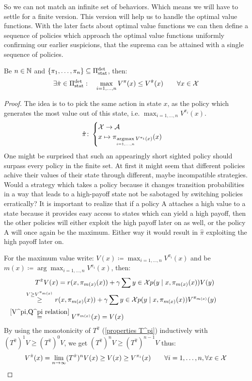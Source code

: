 So we can not match an infinite set of behaviors. Which means we will have to settle for a finite version. This version will help us to handle the optimal value functions. With the later facts about optimal value functions we can then define a sequence of policies which approach the optimal value functions uniformly confirming our earlier suspicions, that the suprema can be attained with a single sequence of policies. 

\begin{prop}\label{finite outmatching}
	Be \(n\in\mathbb{N}\) and \(\{\pi_1,\dots,\pi_n\}\subseteq \Pi_{\textnormal{stat}}^{\textnormal{det}} \), then:
	\[\exists \hat{\pi}\in\Pi_{\textnormal{stat}}^{\textnormal{det}}: \quad \max_{i=1,\dots,n} V^\pi(x)\le V^{\hat{\pi}}(x) \qquad \forall x\in\mathcal{X} \]
\end{prop}
\begin{proof}
	The idea is to to pick the same action in state \(x\), as the policy which generates the most value out of this state, i.e. \(\max_{i=1,\dots,n}V^{\pi_i}(x)\). 
	\[
		\hat{\pi}\colon
	\begin{cases} 
		\mathcal{X}\to\mathcal{A}\\
		x\mapsto \pi_{\mathop{\text{argmax}}\limits_{i=1,\dots,n}V^{\pi_i}(x)}(x)
	\end{cases}
	\]
	One might be surprised that such an appearingly short sighted policy should surpass every policy in the finite set. At first it might seem that different policies achive their values of their state through different, maybe incompatible strategies. Would a strategy which takes a policy because it changes transition probabilities in a way that leads to a high-payoff state not be sabotaged by switching policies erratically?
	It is important to realize that if a policy A attaches a high value to a state because it provides easy access to states which can yield a high payoff, then the other policies will either exploit the high payoff later on as well, or the policy A will once again be the maximum. Either way it would result in \(\hat{\pi}\) exploiting the high payoff later on. 

	For the maximum value write: \(V(x)\coloneqq \max_{i=1,\dots, n}V^{\pi_i}(x)\) and be \(m(x) \coloneqq \arg\max_{i=1,\dots,n}V^{\pi_i}(x)\), then:
	\begin{align*}
		&T^{\hat{\pi}}V(x)=r(x,\pi_{m(x)}(x))
		+\gamma \sum{y\in\cX} p(y\mid x,\pi_{m(x)}(x))V(y)\\
		&\lxgq{V\ge V^{\pi_{m(x)}}} r(x,\pi_{m(x)}(x))
		+\gamma \sum{y\in\cX} p(y\mid x,\pi_{m(x)}(x))V^{\pi_{m(x)}}(y)\\
		&\lxeq{\ref{V^pi,Q^pi relation}} V^{\pi_{m(x)}}(x)=V(x)
	\end{align*}
	By using the monotonicity of \(T^{\hat{\pi}} \) (\ref{properties T^pi}) inductively with \((T^{\hat{\pi}})^1 V \ge (T^{\hat{\pi}})^0 V \), we get
	\( (T^{\hat{\pi}})^n V \ge (T^{\hat{\pi}})^{n-1} V \) thus:
	\[
		V^{\hat{\pi}}(x) = \lim_{n\to\infty} (T^{\hat{\pi}})^n V(x) 
		\ge V(x) \ge V^{\pi_i}(x)
		\qquad \forall i=1,\dots,n, \forall x\in\mathcal{X}
		\qedhere
	\] 
\end{proof}

